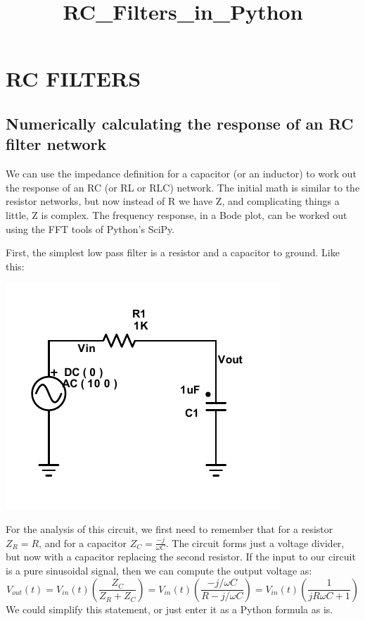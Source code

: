 \documentclass[11pt]{article}
\title{RC\_Filters\_in\_Python}
\makeatletter
\def\maxwidth{\ifdim\Gin@nat@width>\linewidth\linewidth
    \else\Gin@nat@width\fi}
\let\Oldincludegraphics\includegraphics
\renewcommand{\includegraphics}[1]{\Oldincludegraphics[width=.8\maxwidth]{#1}}
\makeatother
\begin{document}
    \maketitle




    \section{RC FILTERS}\label{rc-filters}

\subsection{Numerically calculating the response of an RC filter
network}\label{numerically-calculating-the-response-of-an-rc-filter-network}

We can use the impedance definition for a capacitor (or an inductor) to
work out the response of an RC (or RL or RLC) network. The initial math
is similar to the resistor networks, but now instead of R we have Z, and
complicating things a little, Z is complex. The frequency response, in a
Bode plot, can be worked out using the FFT tools of Python's SciPy.

First, the simplest low pass filter is a resistor and a capacitor to
ground. Like this:

\includegraphics{rc_filter_circuit}

For the analysis of this circuit, we first need to
remember that for a resistor \(Z_R = R\), and for a capacitor
\(Z_C = \frac{-j}{\omega C}\). The circuit forms just a voltage divider,
but now with a capacitor replacing the second resistor. If the input to
our circuit is a pure sinusoidal signal, then we can compute the output
voltage as:
\[ V_{out}(t) = V_{in}(t) \left(\frac{Z_C}{Z_R + Z_C} \right)= V_{in}(t)\left(\frac{-j/\omega C}{R- j/\omega C} \right) = V_{in}(t)\left(\frac{1}{jR\omega C +1} \right)  \]
We could simplify this statement, or just enter it as a Python formula
as is.
\end{document}
